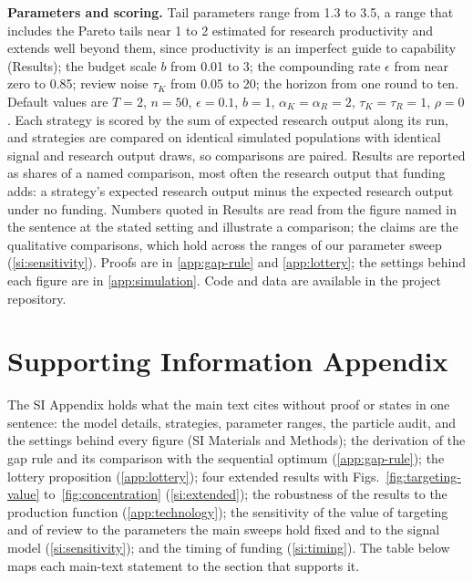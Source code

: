 \documentclass[article, 11pt, reqno]{amsart}
\theoremstyle{named}
\begin{document}
\textbf{Parameters and scoring.} Tail parameters range from 1.3 to 3.5, a range that includes the Pareto tails near 1 to 2 estimated for research productivity \citep{Lotka1926, Nicholls1989} and extends well beyond them, since productivity is an imperfect guide to capability (Results); the budget scale $b$ from 0.01 to 3; the compounding rate $\epsilon$ from near zero to 0.85; review noise $\tau_K$ from 0.05 to 20; the horizon from one round to ten. Default values are $T = 2$, $n = 50$, $\epsilon = 0.1$, $b = 1$, $\alpha_K = \alpha_R = 2$, $\tau_K = \tau_R = 1$, $\rho = 0$. Each strategy is scored by the sum of expected research output along its run, and strategies are compared on identical simulated populations with identical signal and research output draws, so comparisons are paired. Results are reported as shares of a named comparison, most often the research output that funding adds: a strategy's expected research output minus the expected research output under no funding. Numbers quoted in Results are read from the figure named in the sentence at the stated setting and illustrate a comparison; the claims are the qualitative comparisons, which hold across the ranges of our parameter sweep (\ref{si:sensitivity}). Proofs are in \ref{app:gap-rule} and \ref{app:lottery}; the settings behind each figure are in \ref{app:simulation}. Code and data are available in the project repository. %



\clearpage
\section*{Supporting Information Appendix}
\setcounter{section}{0}
\setcounter{figure}{0}
\setcounter{table}{0}
\setcounter{prop}{1} %

The SI Appendix holds what the main text cites without proof or states in one sentence: the model details, strategies, parameter ranges, the particle audit, and the settings behind every figure (SI Materials and Methods); the derivation of the gap rule and its comparison with the sequential optimum (\ref{app:gap-rule}); the lottery proposition (\ref{app:lottery}); four extended results with Figs.~\ref{fig:targeting-value} to~\ref{fig:concentration} (\ref{si:extended}); the robustness of the results to the production function (\ref{app:technology}); the sensitivity of the value of targeting and of review to the parameters the main sweeps hold fixed and to the signal model (\ref{si:sensitivity}); and the timing of funding (\ref{si:timing}). The table below maps each main-text statement to the section that supports it.
\end{document}
